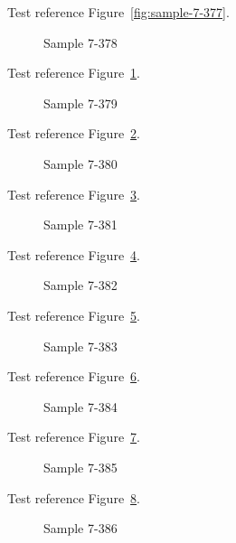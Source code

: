 Test reference Figure~\ref{fig:sample-7-377}.

\begin{figure}[tbhp]
\caption{Sample 7-378}
\label{fig:sample-7-378}
\end{figure}

Test reference Figure~\ref{fig:sample-7-378}.

\begin{figure}[tbhp]
\caption{Sample 7-379}
\label{fig:sample-7-379}
\end{figure}

Test reference Figure~\ref{fig:sample-7-379}.

\begin{figure}[tbhp]
\caption{Sample 7-380}
\label{fig:sample-7-380}
\end{figure}

Test reference Figure~\ref{fig:sample-7-380}.

\begin{figure}[tbhp]
\caption{Sample 7-381}
\label{fig:sample-7-381}
\end{figure}

Test reference Figure~\ref{fig:sample-7-381}.

\begin{figure}[tbhp]
\caption{Sample 7-382}
\label{fig:sample-7-382}
\end{figure}

Test reference Figure~\ref{fig:sample-7-382}.

\begin{figure}[tbhp]
\caption{Sample 7-383}
\label{fig:sample-7-383}
\end{figure}

Test reference Figure~\ref{fig:sample-7-383}.

\begin{figure}[tbhp]
\caption{Sample 7-384}
\label{fig:sample-7-384}
\end{figure}

Test reference Figure~\ref{fig:sample-7-384}.

\begin{figure}[tbhp]
\caption{Sample 7-385}
\label{fig:sample-7-385}
\end{figure}

Test reference Figure~\ref{fig:sample-7-385}.

\begin{figure}[tbhp]
\caption{Sample 7-386}
\label{fig:sample-7-386}
\end{figure}

